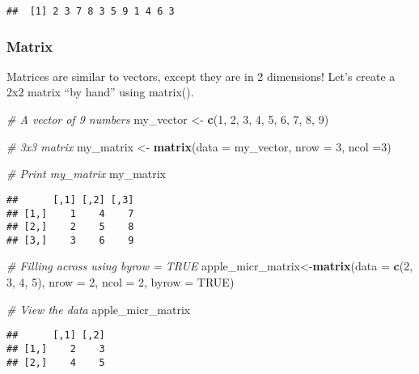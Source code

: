 \documentclass[]{article}
\newenvironment{Shaded}{\begin{snugshade}}{\end{snugshade}}
\newcommand{\KeywordTok}[1]{\textcolor[rgb]{0.13,0.29,0.53}{\textbf{#1}}}
\newcommand{\DataTypeTok}[1]{\textcolor[rgb]{0.13,0.29,0.53}{#1}}
\newcommand{\DecValTok}[1]{\textcolor[rgb]{0.00,0.00,0.81}{#1}}
\newcommand{\StringTok}[1]{\textcolor[rgb]{0.31,0.60,0.02}{#1}}
\newcommand{\CommentTok}[1]{\textcolor[rgb]{0.56,0.35,0.01}{\textit{#1}}}
\newcommand{\OtherTok}[1]{\textcolor[rgb]{0.56,0.35,0.01}{#1}}
\newcommand{\NormalTok}[1]{#1}
\begin{document}
\begin{verbatim}
##  [1] 2 3 7 8 3 5 9 1 4 6 3
\end{verbatim}

\subsubsection{Matrix}\label{matrix}

Matrices are similar to vectors, except they are in 2 dimensions! Let's
create a 2x2 matrix ``by hand'' using matrix().

\begin{Shaded}
\begin{Highlighting}[]
\CommentTok{# A vector of 9 numbers}
\NormalTok{my_vector <-}\StringTok{ }\KeywordTok{c}\NormalTok{(}\DecValTok{1}\NormalTok{, }\DecValTok{2}\NormalTok{, }\DecValTok{3}\NormalTok{, }\DecValTok{4}\NormalTok{, }\DecValTok{5}\NormalTok{, }\DecValTok{6}\NormalTok{, }\DecValTok{7}\NormalTok{, }\DecValTok{8}\NormalTok{, }\DecValTok{9}\NormalTok{)}

\CommentTok{# 3x3 matrix}
\NormalTok{my_matrix <-}\StringTok{ }\KeywordTok{matrix}\NormalTok{(}\DataTypeTok{data =}\NormalTok{ my_vector, }\DataTypeTok{nrow =} \DecValTok{3}\NormalTok{, }\DataTypeTok{ncol =}\DecValTok{3}\NormalTok{)}

\CommentTok{# Print my_matrix}
\NormalTok{my_matrix}
\end{Highlighting}
\end{Shaded}

\begin{verbatim}
##      [,1] [,2] [,3]
## [1,]    1    4    7
## [2,]    2    5    8
## [3,]    3    6    9
\end{verbatim}

\begin{Shaded}
\begin{Highlighting}[]
\CommentTok{# Filling across using byrow = TRUE}
\NormalTok{apple_micr_matrix<-}\KeywordTok{matrix}\NormalTok{(}\DataTypeTok{data =} \KeywordTok{c}\NormalTok{(}\DecValTok{2}\NormalTok{, }\DecValTok{3}\NormalTok{, }\DecValTok{4}\NormalTok{, }\DecValTok{5}\NormalTok{), }\DataTypeTok{nrow =} \DecValTok{2}\NormalTok{, }\DataTypeTok{ncol =} \DecValTok{2}\NormalTok{, }\DataTypeTok{byrow =} \OtherTok{TRUE}\NormalTok{)}

\CommentTok{# View the data}
\NormalTok{apple_micr_matrix}
\end{Highlighting}
\end{Shaded}

\begin{verbatim}
##      [,1] [,2]
## [1,]    2    3
## [2,]    4    5
\end{verbatim}
\end{document}
